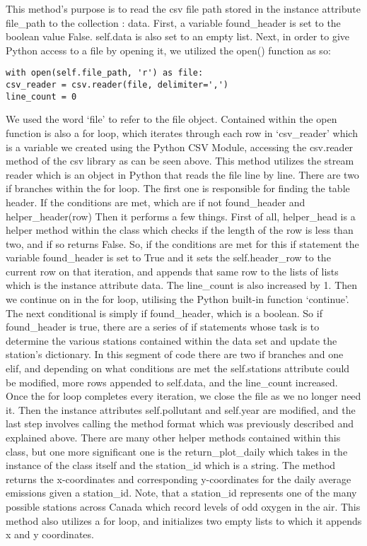 \documentclass[fontsize=11pt]{article}
\begin{document}
 This method’s purpose is to read the csv file path stored in the instance attribute file\_path to the collection : data. First, a variable found\_header is set to the boolean value False. self.data is also set to an empty list. Next, in order to give Python access to a file by opening it, we utilized the open() function as so: 
 
 \begin{verbatim}
with open(self.file_path, 'r') as file:
csv_reader = csv.reader(file, delimiter=',')
line_count = 0
 \end{verbatim}
We used the word ‘file’ to refer to the file object. Contained within the open function is also a for loop, which iterates through each row in ‘csv\_reader’ which is a variable we created using the Python CSV Module, accessing the csv.reader method of the csv library as can be seen above. This method utilizes the stream reader which is an object in Python that reads the file line by line. There are two if branches within the for loop. The first one is responsible for finding the table header. If the conditions are met, which are if not found\_header and helper\_header(row)
Then it performs a few things. First of all, helper\_head is a helper method within the class which checks if the length of the row is less than two, and if so returns False. So, if the conditions are met for this if statement the variable found\_header is set to True and it sets the self.header\_row to the current row on that iteration, and appends that same row to the lists of lists which is the instance attribute data. The line\_count is also increased by 1. Then we continue on in the for loop, utilising the Python built-in function ‘continue’. The next conditional is simply if found\_header, which is a boolean. So if found\_header is true, there are a series of if statements whose task is to determine the various stations contained within the data set and update the station’s dictionary. In this segment of code there are two if branches and one elif, and depending on what conditions are met the self.stations attribute could be modified, more rows appended to self.data, and the line\_count increased. Once the for loop completes every iteration, we close the file as we no longer need it. Then the instance attributes self.pollutant and self.year are modified, and the last step involves calling the method format which was previously described and explained above. There are many other helper methods contained within this class, but one more significant one is the return\_plot\_daily which takes in the instance of the class itself and the station\_id which is a string. The method returns the x-coordinates and corresponding y-coordinates for the daily average emissions given a station\_id. Note, that a station\_id represents one of the many possible stations across Canada which record levels of odd oxygen in the air. This method also utilizes a for loop, and initializes two empty lists to which it appends x and y coordinates. \\
\end{document}
